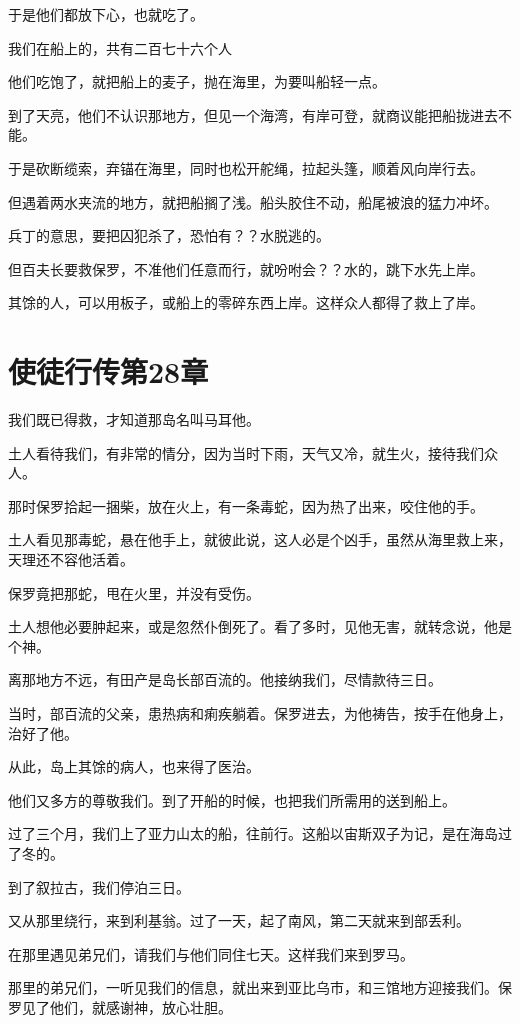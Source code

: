 \documentclass[12pt,oneside]{book}
\begin{document}
于是他们都放下心，也就吃了。

我们在船上的，共有二百七十六个人

他们吃饱了，就把船上的麦子，抛在海里，为要叫船轻一点。

到了天亮，他们不认识那地方，但见一个海湾，有岸可登，就商议能把船拢进去不能。

于是砍断缆索，弃锚在海里，同时也松开舵绳，拉起头篷，顺着风向岸行去。

但遇着两水夹流的地方，就把船搁了浅。船头胶住不动，船尾被浪的猛力冲坏。

兵丁的意思，要把囚犯杀了，恐怕有？？水脱逃的。

但百夫长要救保罗，不准他们任意而行，就吩咐会？？水的，跳下水先上岸。

其馀的人，可以用板子，或船上的零碎东西上岸。这样众人都得了救上了岸。

\chapter{使徒行传第28章}
我们既已得救，才知道那岛名叫马耳他。

土人看待我们，有非常的情分，因为当时下雨，天气又冷，就生火，接待我们众人。

那时保罗拾起一捆柴，放在火上，有一条毒蛇，因为热了出来，咬住他的手。

土人看见那毒蛇，悬在他手上，就彼此说，这人必是个凶手，虽然从海里救上来，天理还不容他活着。

保罗竟把那蛇，甩在火里，并没有受伤。

土人想他必要肿起来，或是忽然仆倒死了。看了多时，见他无害，就转念说，他是个神。

离那地方不远，有田产是岛长部百流的。他接纳我们，尽情款待三日。

当时，部百流的父亲，患热病和痢疾躺着。保罗进去，为他祷告，按手在他身上，治好了他。

从此，岛上其馀的病人，也来得了医治。

他们又多方的尊敬我们。到了开船的时候，也把我们所需用的送到船上。

过了三个月，我们上了亚力山太的船，往前行。这船以宙斯双子为记，是在海岛过了冬的。

到了叙拉古，我们停泊三日。

又从那里绕行，来到利基翁。过了一天，起了南风，第二天就来到部丢利。

在那里遇见弟兄们，请我们与他们同住七天。这样我们来到罗马。

那里的弟兄们，一听见我们的信息，就出来到亚比乌市，和三馆地方迎接我们。保罗见了他们，就感谢神，放心壮胆。
\end{document}
